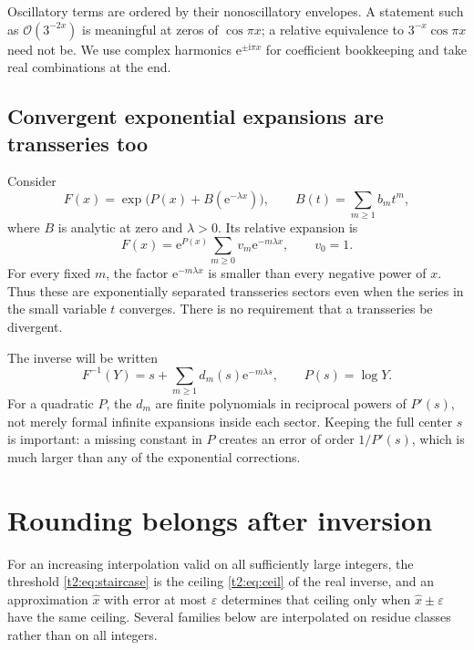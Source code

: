 \documentclass[11pt,openany]{book}
\numberwithin{equation}{chapter}
\theoremstyle{plain}
\theoremstyle{definition}
\theoremstyle{remark}
\newcommand{\ee}{\mathrm e}
\newcommand{\ii}{\mathrm i}
\newcommand{\OO}{\mathcal O}\newcommand{\bigO}{\mathcal O}
\newcommand{\eps}{\varepsilon}
\begin{document}
Oscillatory terms are ordered by their nonoscillatory envelopes. A statement such as $\OO(3^{-2x})$ is meaningful at zeros of $\cos\pi x$; a relative equivalence to $3^{-x}\cos\pi x$ need not be. We use complex harmonics $\ee^{\pm\ii\pi x}$ for coefficient bookkeeping and take real combinations at the end.
\subsection{Convergent exponential expansions are transseries too}

Consider
\begin{equation}\label{t3:eq:basic-shape}
 F(x)=\exp\bigl(P(x)+B(\ee^{-\lambda x})\bigr),\qquad
 B(t)=\sum_{m\ge1}b_m t^m,
\end{equation}
where $B$ is analytic at zero and $\lambda>0$. Its relative expansion is
\[
 F(x)=\ee^{P(x)}\sum_{m\ge0}v_m\ee^{-m\lambda x},\qquad v_0=1.
\]
For every fixed $m$, the factor $\ee^{-m\lambda x}$ is smaller than every negative power of $x$. Thus these are exponentially separated transseries sectors even when the series in the small variable $t$ converges. There is no requirement that a transseries be divergent.

The inverse will be written
\begin{equation}\label{t3:eq:inverse-shape-intro}
 F^{-1}(Y)=s+\sum_{m\ge1}d_m(s)\ee^{-m\lambda s},\qquad
 P(s)=\log Y.
\end{equation}
For a quadratic $P$, the $d_m$ are finite polynomials in reciprocal powers of $P'(s)$, not merely formal infinite expansions inside each sector. Keeping the full center $s$ is important: a missing constant in $P$ creates an error of order $1/P'(s)$, which is much larger than any of the exponential corrections.


\section{Rounding belongs after inversion}
\label{ct:sec:rounding}

For an increasing interpolation valid on all sufficiently large integers,
the threshold \cref{t2:eq:staircase} is the ceiling \cref{t2:eq:ceil} of the
real inverse, and an approximation $\widehat x$ with error at most $\eps$
determines that ceiling only when $\widehat x\pm\eps$ have the same ceiling.
Several families below are interpolated on residue classes rather than on
all integers.
\end{document}
